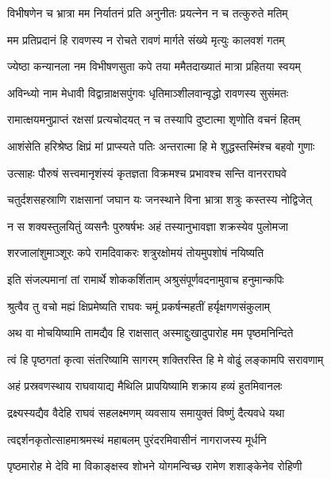 \twolineshloka
{विभीषणेन च भ्रात्रा मम निर्यातनं प्रति}
{अनुनीतः प्रयत्नेन न च तत्कुरुते मतिम्} %

\twolineshloka
{मम प्रतिप्रदानं हि रावणस्य न रोचते}
{रावणं मार्गते संख्ये मृत्युः कालवशं गतम्} %

\twolineshloka
{ज्येष्ठा कन्यानला नम विभीषणसुता कपे}
{तया ममैतदाख्यातं मात्रा प्रहितया स्वयम्} %

\twolineshloka
{अविन्ध्यो नाम मेधावी विद्वान्राक्षसपुंगवः}
{धृतिमाञ्शीलवान्वृद्धो रावणस्य सुसंमतः} %

\twolineshloka
{रामात्क्षयमनुप्राप्तं रक्षसां प्रत्यचोदयत्}
{न च तस्यापि दुष्टात्मा शृणोति वचनं हितम्} %

\twolineshloka
{आशंसेति हरिश्रेष्ठ क्षिप्रं मां प्राप्स्यते पतिः}
{अन्तरात्मा हि मे शुद्धस्तस्मिंश्च बहवो गुणाः} %

\twolineshloka
{उत्साहः पौरुषं सत्त्वमानृशंस्यं कृतज्ञता}
{विक्रमश्च प्रभावश्च सन्ति वानरराघवे} %

\twolineshloka
{चतुर्दशसहस्राणि राक्षसानां जघान यः}
{जनस्थाने विना भ्रात्रा शत्रुः कस्तस्य नोद्विजेत्} %

\twolineshloka
{न स शक्यस्तुलयितुं व्यसनैः पुरुषर्षभः}
{अहं तस्यानुभावज्ञा शक्रस्येव पुलोमजा} %

\twolineshloka
{शरजालांशुमाञ्शूरः कपे रामदिवाकरः}
{शत्रुरक्षोमयं तोयमुपशोषं नयिष्यति} %

\twolineshloka
{इति संजल्पमानां तां रामार्थे शोककर्शिताम्}
{अश्रुसंपूर्णवदनामुवाच हनुमान्कपिः} %

\twolineshloka
{श्रुत्वैव तु वचो मह्यं क्षिप्रमेष्यति राघवः}
{चमूं प्रकर्षन्महतीं हर्यृक्षगणसंकुलाम्} %

\twolineshloka
{अथ वा मोचयिष्यामि तामद्यैव हि राक्षसात्}
{अस्माद्दुःखादुपारोह मम पृष्ठमनिन्दिते} %

\twolineshloka
{त्वं हि पृष्ठगतां कृत्वा संतरिष्यामि सागरम्}
{शक्तिरस्ति हि मे वोढुं लङ्कामपि सरावणाम्} %

\twolineshloka
{अहं प्रस्रवणस्थाय राघवायाद्य मैथिलि}
{प्रापयिष्यामि शक्राय हव्यं हुतमिवानलः} %

\twolineshloka
{द्रक्ष्यस्यद्यैव वैदेहि राघवं सहलक्ष्मणम्}
{व्यवसाय समायुक्तं विष्णुं दैत्यवधे यथा} %

\twolineshloka
{त्वद्दर्शनकृतोत्साहमाश्रमस्थं महाबलम्}
{पुरंदरमिवासीनं नागराजस्य मूर्धनि} %

\twolineshloka
{पृष्ठमारोह मे देवि मा विकाङ्क्षस्व शोभने}
{योगमन्विच्छ रामेण शशाङ्केनेव रोहिणी} %

